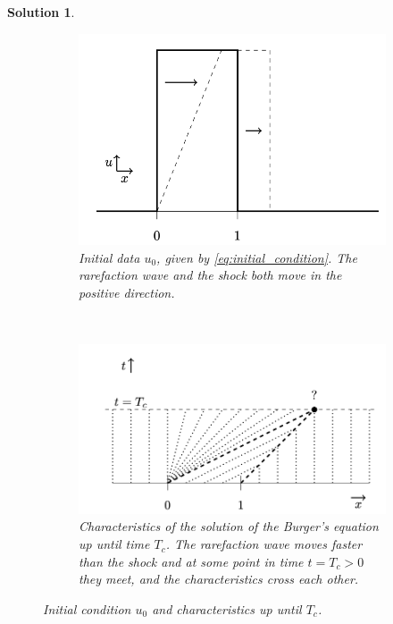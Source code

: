 \documentclass[10pt,letterpaper]{article}
\theoremstyle{break}
\newtheorem{mysolution}{Solution}
\newenvironment{solution}{\begin{mysolution}}{\end{mysolution}}
\begin{document}
\begin{solution}
    \begin{figure}
        \centering
        \begin{subfigure}[b]{0.5\textwidth}
            \includegraphics[width=\textwidth]{figures02/ex_set_2_3} 
            \caption{Initial data $u_0$, given by \eqref{eq:initial_condition}.
            The rarefaction wave and the shock both move in the positive direction.}
            \label{fig:u_0}
        \end{subfigure}
        ~
        \begin{subfigure}[b]{0.5\textwidth}
            \includegraphics[width=\textwidth]{figures02/ex_set_2_2} 
            \caption{Characteristics of the solution of the Burger's equation
            up until time $T_c$. The rarefaction wave moves faster than
            the shock and at some point in time $t = T_c > 0$ they meet,
            and the characteristics cross each other.}
            \label{fig:characteritics}
        \end{subfigure}
        \caption{Initial condition $u_0$ and characteristics up until $T_c$.}
        \label{problem3_part1}
    \end{figure}
    

\end{solution}
\end{document}
